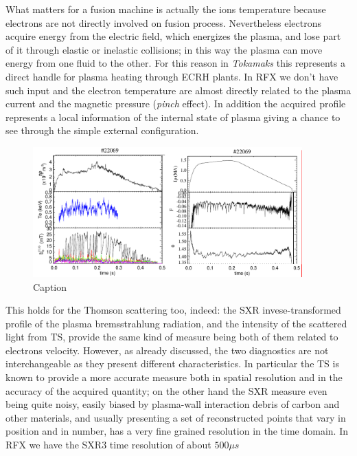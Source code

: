 What matters for a fusion machine is actually the ions temperature because electrons are not directly involved on fusion process.
Nevertheless electrons acquire energy from the electric field, which energizes the plasma, and lose part of it through elastic or inelastic collisions; in this way the plasma can move energy from one fluid to the other. For this reason in \textit{Tokamaks} this represents a direct handle for plasma heating through \acs{ECRH} plants. In RFX we don't have such input and the electron temperature are almost directly related to the plasma current and the magnetic pressure (\textit{pinch} effect).
In addition the acquired profile represents a local information of the internal state of plasma giving a chance to see through the simple external configuration.
\begin{figure}
    \centering
    \includegraphics[height=5cm]{img/rfx/shot_example.png}
    \caption{Caption}
    \label{fig:rfx_shot_22069}
\end{figure}
This holds for the Thomson scattering too, indeed: the SXR invese-transformed profile of the plasma bremsstrahlung radiation, and the intensity of the scattered light from TS, provide the same kind of measure being both of them related to electrons velocity.
However, as already discussed, the two diagnostics are not interchangeable as they present different characteristics. In particular the TS is known to provide a more accurate measure both in spatial resolution and in the accuracy of the acquired quantity; on the other hand the SXR measure even being quite noisy, easily biased by plasma-wall interaction debris of carbon and other materials, and usually presenting a set of reconstructed points that vary in position and in number, has a very fine grained resolution in the time domain.
In RFX we have the SXR3 time resolution of about $500 \mu s$

